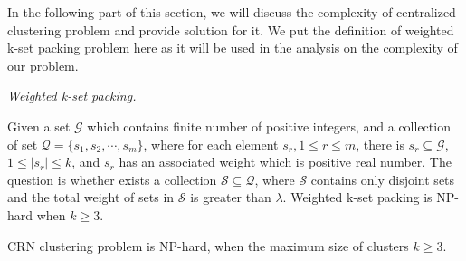 
In the following part of this section, we will discuss the complexity of centralized clustering problem and provide solution for it.
We put the definition of weighted k-set packing problem here as it will be used in the analysis on the complexity of our problem.

\begin{mydef}
\label{def_kset_packing}
\textit{Weighted k-set packing.} 

Given a set $\mathcal{G}$ which contains finite number of positive integers, and a collection of set $\mathcal{Q}=\{s_1,s_2,\cdots,s_m\}$, where for each element $s_r, 1\leq r \leq m$, there is $s_r\subseteq \mathcal{G}$, $ 1\leq|s_r| \leq k$, and $s_r$ has an associated weight which is positive real number.
The question is whether exists a collection $\mathcal{S}\subseteq \mathcal{Q}$, where $\mathcal{S}$ contains only disjoint sets and the total weight of sets in $\mathcal{S}$ is greater than $\lambda$.
Weighted k-set packing is NP-hard when $k\geqslant 3$.~\cite{Computers_a_Intractability}
\end{mydef}

\begin{theorem}
\label{theorem1}
CRN clustering problem is NP-hard, when the maximum size of clusters $k\geqslant 3$.
\end{theorem}

